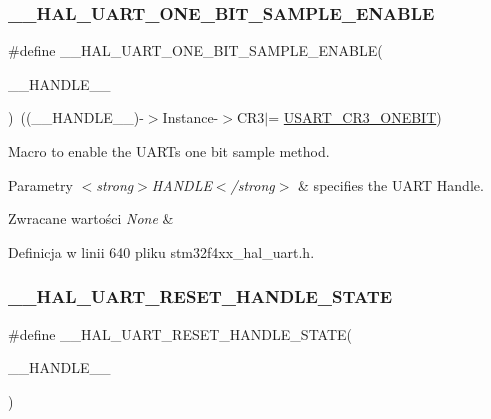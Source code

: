 \subsubsection{\texorpdfstring{\+\_\+\+\_\+\+H\+A\+L\+\_\+\+U\+A\+R\+T\+\_\+\+O\+N\+E\+\_\+\+B\+I\+T\+\_\+\+S\+A\+M\+P\+L\+E\+\_\+\+E\+N\+A\+B\+LE}{\_\_HAL\_UART\_ONE\_BIT\_SAMPLE\_ENABLE}}
{\footnotesize\ttfamily \#define \+\_\+\+\_\+\+H\+A\+L\+\_\+\+U\+A\+R\+T\+\_\+\+O\+N\+E\+\_\+\+B\+I\+T\+\_\+\+S\+A\+M\+P\+L\+E\+\_\+\+E\+N\+A\+B\+LE(\begin{DoxyParamCaption}\item[{}]{\+\_\+\+\_\+\+H\+A\+N\+D\+L\+E\+\_\+\+\_\+ }\end{DoxyParamCaption})~((\+\_\+\+\_\+\+H\+A\+N\+D\+L\+E\+\_\+\+\_\+)-\/$>$Instance-\/$>$C\+R3$\vert$= \hyperlink{group___peripheral___registers___bits___definition_ga9a96fb1a7beab602cbc8cb0393593826}{U\+S\+A\+R\+T\+\_\+\+C\+R3\+\_\+\+O\+N\+E\+B\+IT})}



Macro to enable the U\+A\+RT\textquotesingle{}s one bit sample method. 


\begin{DoxyParams}{Parametry}
{\em $<$strong$>$\+H\+A\+N\+D\+L\+E$<$/strong$>$} & specifies the U\+A\+RT Handle. \\
\hline
\end{DoxyParams}

\begin{DoxyRetVals}{Zwracane wartości}
{\em None} & \\
\hline
\end{DoxyRetVals}


Definicja w linii 640 pliku stm32f4xx\+\_\+hal\+\_\+uart.\+h.

\mbox{\label{group___u_a_r_t___exported___macros_ga19deab848407b106998416c78092fa9b}} 
\subsubsection{\texorpdfstring{\+\_\+\+\_\+\+H\+A\+L\+\_\+\+U\+A\+R\+T\+\_\+\+R\+E\+S\+E\+T\+\_\+\+H\+A\+N\+D\+L\+E\+\_\+\+S\+T\+A\+TE}{\_\_HAL\_UART\_RESET\_HANDLE\_STATE}}
{\footnotesize\ttfamily \#define \+\_\+\+\_\+\+H\+A\+L\+\_\+\+U\+A\+R\+T\+\_\+\+R\+E\+S\+E\+T\+\_\+\+H\+A\+N\+D\+L\+E\+\_\+\+S\+T\+A\+TE(\begin{DoxyParamCaption}\item[{}]{\+\_\+\+\_\+\+H\+A\+N\+D\+L\+E\+\_\+\+\_\+ }\end{DoxyParamCaption})}

